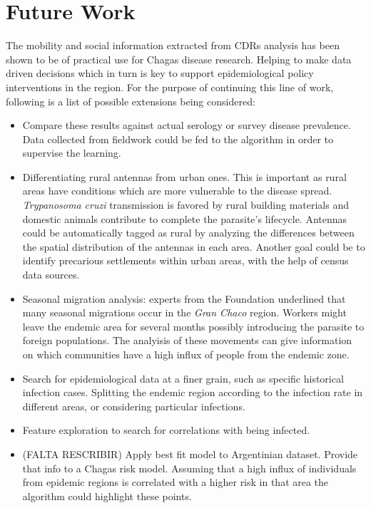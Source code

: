 \section{Future Work}

The mobility and social information extracted from CDRs analysis has been shown to be of practical use for Chagas disease research. Helping to make data driven decisions which in turn is key to support epidemiological policy interventions in the region. For the purpose of continuing this line of work, following is a list of possible extensions being considered:

\begin{itemize}
    \item Compare these results against actual serology or survey disease prevalence. Data collected from fieldwork could be fed to the algorithm in order to supervise the learning. 
    \item Differentiating rural antennas from urban ones. This is important as rural areas have conditions which are more vulnerable to the disease spread. \textit{Trypanosoma cruzi} transmission is favored by rural building materials and domestic animals contribute to complete the parasite's lifecycle. Antennas could be automatically tagged as rural by analyzing the differences between the spatial distribution of the antennas in each area. Another goal could be to identify precarious settlements within urban areas, with the help of census data sources.
    \item Seasonal migration analysis:  experts from the Foundation underlined that many seasonal migrations occur in the \textit{Gran Chaco} region.  Workers might leave the endemic area for several months possibly introducing the parasite to foreign populations. The analyisis of these movements can give information on which communities have a high influx of people from the endemic zone.
    \item Search for epidemiological data at a finer grain, such as specific historical infection cases. Splitting the endemic region according to the infection rate in different areas, or considering particular infections.
    \item Feature exploration to search for correlations with being infected.
    \item (FALTA RESCRIBIR) Apply best fit model to Argentinian dataset. Provide that info to a Chagas risk model. Assuming that a high influx of individuals from epidemic regions is correlated with a higher risk in that area the algorithm could highlight these points. %
\end{itemize}

